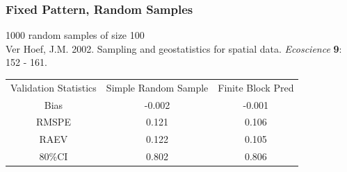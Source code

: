 \documentclass[mathserif,compress]{beamer}\usepackage{graphicx, color}
\newcommand{\cre}[1]{\color{red!70!black}#1}
\newcommand{\cbl}[1]{\color{blue!70!black}#1}
\begin{document}

\begin{frame}[fragile]
\frametitle{Fixed Pattern, Random Samples}

1000 random samples of size 100 \\
\tiny
Ver Hoef, J.M.  2002.  Sampling and geostatistics for spatial data.  {\it Ecoscience} {\bf 9}: 152 - 161.\\
\footnotesize
	\begin{table}[ht]
	\centering
	\begin{tabular}{ccc}
	Validation Statistics & Simple Random Sample & Finite Block Pred \\ 
	\cbl{Bias} & \cre{-0.002} & \cre{-0.001} \\ 
	\cbl{RMSPE} & \cre{0.121} & \cre{0.106} \\ 
	\cbl{RAEV} & \cre{0.122} & \cre{0.105} \\ 
	\cbl{80\%CI} & \cre{0.802} & \cre{0.806} \\ 
	\end{tabular}
	\end{table}

\end{frame}

\end{document}
